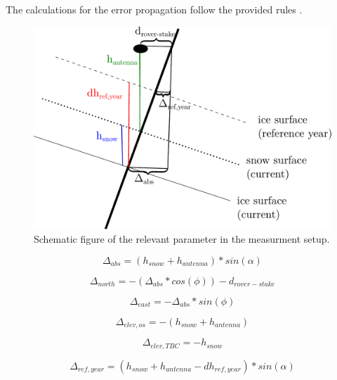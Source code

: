 The calculations for the error propagation follow the provided rules \citep{errorprop}.



\citep{Trprocess}
\begin{figure}
\centering
\includegraphics[width=\linewidth]{./figs/pictures/schematic_setup.pdf}
\caption{Schematic figure of the relevant parameter in the measurment setup.}
\end{figure}

\begin{equation}
	\Delta_{abs} = (h_{snow} + h_{antenna}) * sin(\alpha)
\end{equation}

\begin{equation}
	\Delta_{north} = - (\Delta_{abs} * cos(\phi)) - d_{rover-stake}
\end{equation}

\begin{equation}
	\Delta_{east} = - \Delta_{abs} * sin(\phi)
\end{equation}

\begin{equation}
	\Delta_{elev,os} = - (h_{snow} + h_{antenna}) 
\end{equation}

\begin{equation}
	\Delta_{elev,TBC} = - h_{snow} 
\end{equation}

\begin{equation}
	\Delta_{ref,year} = (h_{snow} + h_{antenna} - dh_{ref,year}) * sin(\alpha)
\end{equation}

